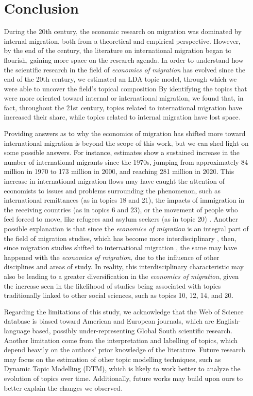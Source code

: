 \section{Conclusion} \label{conclusion}

During the 20th century, the economic research on migration was dominated by internal migration, both from a theoretical and empirical perspective. However, by the end of the century, the literature on international migration began to flourish, gaining more space on the research agenda. In order to understand how the scientific research in the field of \textit{economics of migration} has evolved since the end of the 20th century, we estimated an LDA topic model, through which we were able to uncover the field's topical composition By identifying the topics that were more oriented toward internal or international migration, we found that, in fact, throughout the 21st century, topics related to international migration have increased their share, while topics related to internal migration have lost space.

Providing answers as to why the economics of migration has shifted more toward international migration is beyond the scope of this work, but we can shed light on some possible answers. For instance, estimates show a sustained increase in the number of international migrants since the 1970s, jumping from approximately 84 million in 1970 to 173 million in 2000, and reaching 281 million in 2020. This increase in international migration flows may have caught the attention of economists to issues and problems surrounding the phenomenon, such as international remittances (as in topics 18 and 21), the impacts of immigration in the receiving countries (as in topics 6 and 23), or the movement of people who feel forced to move, like refugees and asylum seekers (as in topic 20) \citep{mcauliffe_world_2024}. Another possible explanation is that since the \textit{economics of migration} is an integral part of the field of migration studies, which has become more interdisciplinary \citep{levy_between_2020}, then, since migration studies shifted to international migration \citep{cushing_crossing_2004, king_mind_2010}, the same may have happened with the \textit{economics of migration}, due to the influence of other disciplines and areas of study. In reality, this interdisciplinary characteristic may also be leading to a greater diversification in the \textit{economics of migration}, given the increase seen in the likelihood of studies being associated with topics traditionally linked to other social sciences, such as topics 10, 12, 14, and 20.

Regarding the limitations of this study, we acknowledge that the Web of Science database is biased toward American and European journals, which are English-language based, possibly under-representing Global South scientific research. Another limitation come from the interpretation and labelling of topics, which depend heavily on the authors' prior knowledge of the literature. Future research may focus on the estimation of other topic modelling techniques, such as Dynamic Topic Modelling (DTM), which is likely to work better to analyze the evolution of topics over time. Additionally, future works may build upon ours to better explain the changes we observed.